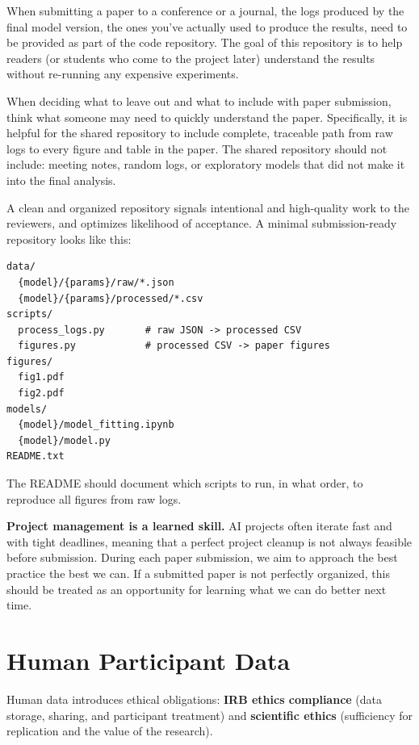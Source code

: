 \documentclass[11pt, letterpaper]{article}
\begin{document}
When submitting a paper to a conference or a journal, the logs produced by the final model version, the ones you've actually used to produce the results, need to be provided as part of the code repository. The goal of this repository is to help readers (or students who come to the project later) understand the results without re-running any expensive experiments.

When deciding what to leave out and what to include with paper submission, think  what someone may need to quickly understand the paper. Specifically, it is helpful for the shared repository to include complete, traceable path from raw logs to every figure and table in the paper. The shared repository should not include: meeting notes, random logs, or exploratory models that did not make it into the final analysis.

A clean and organized repository signals intentional and high-quality work to the reviewers, and optimizes likelihood of acceptance. A minimal submission-ready repository looks like this:

\begin{lstlisting}
data/
  {model}/{params}/raw/*.json
  {model}/{params}/processed/*.csv
scripts/
  process_logs.py       # raw JSON -> processed CSV
  figures.py            # processed CSV -> paper figures
figures/
  fig1.pdf
  fig2.pdf
models/
  {model}/model_fitting.ipynb
  {model}/model.py
README.txt
\end{lstlisting}

The README should document which scripts to run, in what order, to reproduce
all figures from raw logs.

\textbf{Project management is a learned skill.} AI projects often iterate fast and with tight deadlines, meaning that a perfect project cleanup is not always feasible before submission. During each paper submission, we aim to approach the best practice the best we can. If a submitted paper is not perfectly organized, this should be treated as an opportunity for learning what we can do better next time. 

\section{Human Participant Data}\label{sec:human}

Human data introduces ethical obligations: \textbf{IRB ethics compliance} (data storage, sharing, and participant treatment) and \textbf{scientific ethics} (sufficiency for replication and the value of the research).
\end{document}
